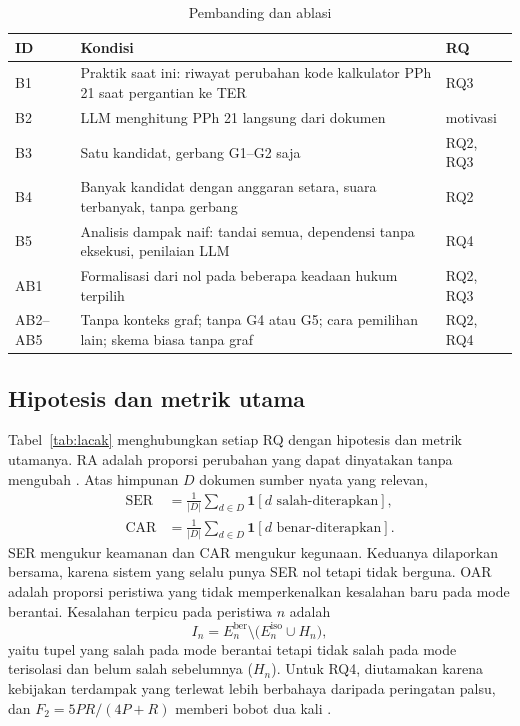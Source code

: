 \begin{table}[t]
\centering
\caption{Pembanding dan ablasi}
\label{tab:pembanding}
\scriptsize
\begin{tabularx}{\columnwidth}{@{}P{0.55cm} L P{0.85cm}@{}}
\toprule
\textbf{ID} & \textbf{Kondisi} & \textbf{RQ} \\
\midrule
B1 & Praktik saat ini: riwayat perubahan kode kalkulator PPh 21  saat pergantian ke TER & RQ3 \\
B2 & LLM menghitung PPh 21 langsung dari dokumen & motivasi \\
B3 & Satu kandidat, gerbang G1--G2 saja & RQ2, RQ3 \\
B4 & Banyak kandidat dengan anggaran setara, suara terbanyak, tanpa gerbang & RQ2 \\
B5 & Analisis dampak naif: tandai semua, dependensi tanpa eksekusi, penilaian LLM & RQ4 \\
AB1 & Formalisasi dari nol pada beberapa keadaan hukum terpilih & RQ2, RQ3 \\
AB2--AB5 & Tanpa konteks graf; tanpa G4 atau G5; cara pemilihan lain; skema biasa tanpa graf & RQ2, RQ4 \\
\bottomrule
\end{tabularx}
\end{table}

\subsection{Hipotesis dan metrik utama}
Tabel~\ref{tab:lacak} menghubungkan setiap RQ dengan hipotesis dan metrik utamanya. RA adalah proporsi perubahan yang dapat dinyatakan tanpa mengubah . Atas himpunan $D$ dokumen sumber nyata yang relevan,
\begin{align}
\mathrm{SER} &= \tfrac{1}{|D|}\textstyle\sum_{d \in D} \mathbf{1}[d \text{ salah-diterapkan}], \label{eq:ser}\\
\mathrm{CAR} &= \tfrac{1}{|D|}\textstyle\sum_{d \in D} \mathbf{1}[d \text{ benar-diterapkan}]. \nonumber
\end{align}
SER mengukur keamanan dan CAR mengukur kegunaan. Keduanya dilaporkan bersama, karena sistem yang selalu  punya SER nol tetapi tidak berguna. OAR adalah proporsi peristiwa yang tidak memperkenalkan kesalahan baru pada mode berantai. Kesalahan terpicu pada peristiwa $n$ adalah
\begin{equation}
I_n = E^{\mathrm{ber}}_n \setminus \big(E^{\mathrm{iso}}_n \cup H_n\big),
\label{eq:terpicu}
\end{equation}
yaitu tupel yang salah pada mode berantai tetapi tidak salah pada mode terisolasi dan belum salah sebelumnya ($H_n$). Untuk RQ4,  diutamakan karena kebijakan terdampak yang terlewat lebih berbahaya daripada peringatan palsu, dan $F_2 = 5PR/(4P+R)$ memberi bobot  dua kali .

